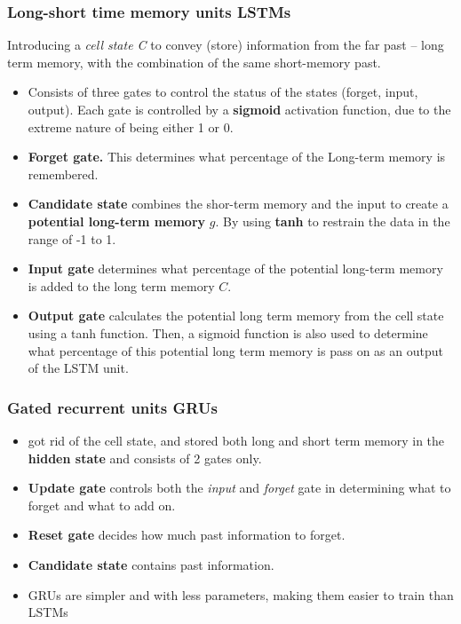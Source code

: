 \documentclass[a4paper,10pt]{article}
\begin{document}
\subsubsection{Long-short time memory units LSTMs}
Introducing a \textit{cell state C} to convey (store) information from the far past -- long term memory, with the combination of the same short-memory past. 
\begin{itemize}
    \item Consists of three gates to control the status of the states (forget, input, output). Each gate is controlled by a \textbf{sigmoid} activation function, due to the extreme nature of being either 1 or 0.
    \item \textbf{Forget gate.} This determines what percentage of the Long-term memory is remembered. 
    \item \textbf{Candidate state} combines the shor-term memory and the input to create a \textbf{potential long-term memory} $g$. By using \textbf{tanh} to restrain the data in the range of -1 to 1. 
    \item \textbf{Input gate} determines what percentage of the potential long-term memory is added to the long term memory $C$.
    \item \textbf{Output gate} calculates the potential long term memory from the cell state using a tanh function. Then, a sigmoid function is also used to determine what percentage of this potential long term memory is pass on as an output of the LSTM unit. 
\end{itemize}

\subsubsection{Gated recurrent units GRUs}
\begin{itemize}
    \item got rid of the cell state, and stored both long and short term memory in the \textbf{hidden state} and consists of 2 gates only.
    \item \textbf{Update gate} controls both the \textit{input} and \textit{forget} gate in determining what to forget and what to add on. 
    \item \textbf{Reset gate} decides how much past information to forget. 
    \item \textbf{Candidate state} contains past information.
    \item GRUs are simpler and with less parameters, making them easier to train than LSTMs
\end{itemize}
\end{document}
